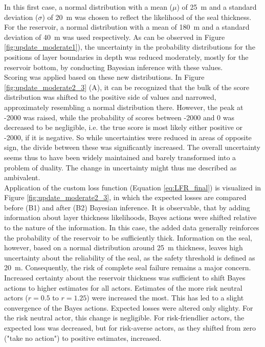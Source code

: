 				In this first case, a normal distribution with a mean ($\mu$) of 25~m and a standard deviation ($\sigma$) of 20~m was chosen to reflect the likelihood of the seal thickness. For the reservoir, a normal distribution with a mean of 180~m and a standard deviation of 40~m was used respectively. As can be observed in Figure \ref{fig:update_moderate1}), the uncertainty in the probability distributions for the positions of layer boundaries in depth was reduced moderately, mostly for the reservoir bottom, by conducting Bayesian inference with these values.\\					
				Scoring was applied based on these new distributions. In Figure \ref{fig:update_moderate2_3} (A), it can be recognized that the bulk of the score distribution was shifted to the positive side of values and narrowed, approximately resembling a normal distribution there. However, the peak at -2000 was raised, while the probability of scores between -2000 and 0 was decreased to be negligible, i.e. the true score is most likely either positive or -2000, if it is negative. So while uncertainties were reduced in areas of opposite sign, the divide between these was significantly increased. The overall uncertainty seems thus to have been widely maintained and barely transformed into a problem of duality. The change in uncertainty might thus me described as ambivalent.\\
				Application of the custom loss function (Equation \ref{eq:LFR_final}) is visualized in Figure \ref{fig:update_moderate2_3}, in which the expected losses are compared before (B1) and after (B2) Bayesian inference. It is observable, that by adding information about layer thickness likelihoods, Bayes actions were shifted relative to the nature of the information. In this case, the added data generally reinforces the probability of the reservoir to be sufficiently thick. Information on the seal, however, based on a normal distribution around 25~m thickness, leaves high uncertainty about the reliability of the seal, as the safety threshold is defined as 20~m. Consequently, the risk of complete seal failure remains a major concern.\\				
				Increased certainty about the reservoir thickness was sufficient to shift Bayes actions to higher estimates for all actors. Estimates of the more risk neutral actors ($r = 0.5$ to $r=1.25$) were increased the most. This has led to a slight convergence of the Bayes actions. Expected losses were altered only slighty. For the risk neutral actor, this change is negligible. For risk-friendlier actors, the expected loss was decreased, but for risk-averse actors, as they shifted from zero ("take no action") to positive estimates, increased.\\	
